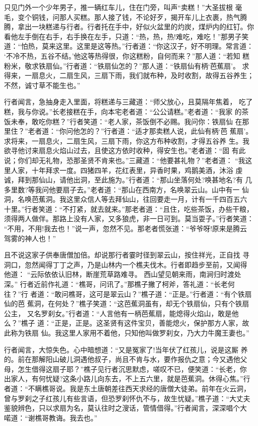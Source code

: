 只见门外一个少年男子，推一辆红车儿，住在门旁，叫声“卖糕！”大圣拔根
毫毛，变个铜钱，问那人买糕。那人接了钱，不论好歹，揭开车儿上衣裹，热气腾
腾，拿出一块糕递与行者。行者托在手中，好似火盆里的灼炭，煤炉内的红钉。你
看他左手倒在右手，右手换在左手，只道：“热，热，热!难吃，难吃！”那男子笑
道：“怕热，莫来这里。这里是这等热。”行者道：“你这汉子，好不明理。常言道：
‘不冷不热，五谷不结。’他这等热得很，你这糕粉，自何而来？”那人道：“若知
糕粉米，敬求铁扇仙。”行者道：“铁扇仙怎的？”那人道：“铁扇仙有柄‘芭蕉扇’。
求得来，一扇息火，二扇生风，三扇下雨，我们就布种，及时收割，故得五谷养生；
不然，诚寸草不能生也。”

行者闻言，急抽身走入里面，将糕递与三藏道：“师父放心，且莫隔年焦着，
吃了糕，我与你说。”长老接糕在手，向本宅老者道：“公公请糕。”老者道：“我家
的茶饭未奉，敢吃你糕？”行者笑道：“老人家，茶饭倒不必赐。我问你：铁扇仙
在那里住？”老者道：“你问他怎的？”行者道：“适才那卖糕人说，此仙有柄‘芭
蕉扇’。求将来，一扇息火，二扇生风，三扇下雨，你这方布种收割，才得五谷养
生。我欲寻他讨来扇息火焰山过去，且使这方依时收种，得安生也。”老者道：“固
有此说；你们却无礼物，恐那圣贤不肯来也。”三藏道：“他要甚礼物？”老者道：
“我这里人家，十年拜求一度。四猪四羊，花红表里，异香时果，鸡鹅美酒，沐浴
虔诚，拜到那仙山，请他出洞，至此施为。”行者道：“那山坐落何处?唤甚地名?有
几多里数?等我问他要扇子去。”老者道：“那山在西南方，名唤翠云山。山中有一
仙洞，名唤芭蕉洞。我这里众信人等去拜仙山，往回要走一月，计有一千四百五六
十里。”行者笑道：“不打紧，就去就来。”那老者道：“且住，吃些茶饭，办些干粮，
须得两人做伴。那路上没有人家，又多狼虎，非一日可到。莫当耍子。”行者笑道：
“不用，不用!我去也！”说一声，忽然不见。那老者慌张道：“爷爷呀!原来是腾云
驾雾的神人也！”

且不说这家子供奉唐僧加倍。却说那行者霎时径到翠云山，按住祥光，正自找
寻洞口，忽然闻得丁丁之声，乃是山林内一个樵夫伐木。行者即趋步至前，又闻得
他道：
“云际依依认旧林，断崖荒草路难寻。
西山望见朝来雨，南涧归时渡处深。”
行者近前作礼道：“樵哥，问讯了。”那樵子撇了柯斧，答礼道：“长老何往？”行
者道：“敢问樵哥，这可是翠云山？”樵子道：“正是。”行者道：“有个铁扇仙的芭
蕉洞，在何处？”樵子笑道：“这芭蕉洞虽有，却无个铁扇仙，只有个铁扇公主，
又名罗刹女。”行者道：“人言他有一柄芭蕉扇，能熄得火焰山，敢是他么？”樵子
道：“正是，正是。这圣贤有这件宝贝，善能熄火，保护那方人家，故此称为铁扇
仙。我这里人家用不着他，只知他叫做罗刹女，乃大力牛魔王妻也。”

行者闻言，大惊失色。心中暗想道：“又是冤家了!当年伏了红孩儿，说是这厮
养的。前在那解阳山破儿洞遇他叔子，尚且不肯与水，要作报仇之意；今又遇他父
母，怎生借得这扇子耶？”樵子见行者沉思默虑，嗟叹不已，便笑道：“长老，你
出家人，有何忧疑?这条小路儿向东去，不上五六里，就是芭蕉洞。休得心焦。”行
者道：“不瞒樵哥说。我是东土唐朝差往西天求经的唐僧大徒弟。前年在火云洞，
曾与罗刹之子红孩儿有些言语，但恐罗刹怀仇不与，故生忧疑。”樵子道：“大丈夫
鉴貌辨色，只以求扇为名，莫认往时之溲话，管情借得。”行者闻言，深深唱个大
喏道：“谢樵哥教诲。我去也。”

